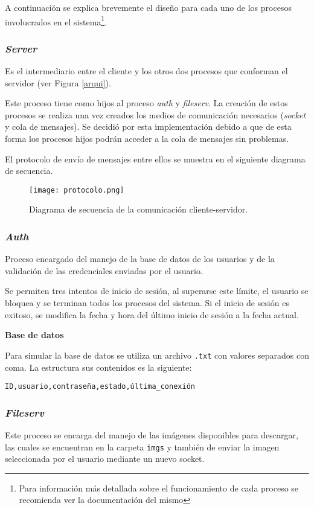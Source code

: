 \documentclass[12pt,a4paper]{article}
\begin{document}
A continuación se explica brevemente el diseño para cada uno de los
procesos involucrados en el sistema\footnote{Para información más
detallada sobre el funcionamiento de cada proceso se recomienda ver
la documentación del mismo}.

\subsubsection{\emph{Server}}
\label{server_ps}
Es el intermediario entre el cliente y los otros dos procesos que
conforman el servidor (ver Figura \ref{arqui}).

Este proceso tiene como hijos al proceso \emph{auth} y \emph{fileserv}.
La creación de estos procesos se realiza una vez creados los medios
de comunicación necesarios (\emph{socket} y cola de mensajes). Se
decidió por esta implementación debido a que de esta forma los
procesos hijos podrán acceder a la cola de mensajes sin problemas.

El protocolo de envío de mensajes entre ellos se muestra en el
siguiente diagrama de secuencia.

\begin{figure}[H]
  \center
  \texttt{[image: protocolo.png]}
  \caption{Diagrama de secuencia de la comunicación cliente-servidor.}
  \label{com_seq}
\end{figure}

\subsubsection{\emph{Auth}}
\label{auth_ps}
Proceso encargado del manejo de la base de datos de los usuarios y
de la validación de las credenciales enviadas por el usuario.

Se permiten tres intentos de inicio de sesión, al superarse este
límite, el usuario se bloquea y se terminan todos los procesos del
sistema. Si el inicio de sesión es exitoso, se modifica la fecha
y hora del último inicio de sesión a la fecha actual.

\textbf{Base de datos}

Para simular la base de datos se utiliza un archivo \verb|.txt| con
valores separados con coma. La estructura sus contenidos es la
siguiente:

\begin{center}
  \verb|ID,usuario,contraseña,estado,última_conexión|
\end{center}


\subsubsection{\emph{Fileserv}}
\label{files_ps}
Este proceso se encarga del manejo de las imágenes disponibles
para descargar, las cuales se encuentran en la carpeta \verb|imgs|
y también de enviar la imagen seleccionada por el usuario mediante
un nuevo socket.
\end{document}
